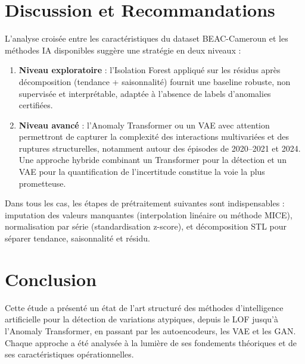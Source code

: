 \documentclass[12pt, a4paper]{article}
\begin{document}
\section{Discussion et Recommandations}
\label{sec:discussion}

L'analyse croisée entre les caractéristiques du dataset BEAC-Cameroun et
les méthodes IA disponibles suggère une stratégie en deux niveaux :

\begin{enumerate}
    \item \textbf{Niveau exploratoire} : l'Isolation Forest appliqué sur
          les résidus après décomposition (tendance + saisonnalité) fournit
          une baseline robuste, non supervisée et interprétable, adaptée à
          l'absence de labels d'anomalies certifiées.

    \item \textbf{Niveau avancé} : l'Anomaly Transformer ou un VAE avec
          attention permettront de capturer la complexité des interactions
          multivariées et des ruptures structurelles, notamment autour des
          épisodes de 2020--2021 et 2024. Une approche hybride combinant
          un Transformer pour la détection et un VAE pour la quantification
          de l'incertitude constitue la voie la plus prometteuse.
\end{enumerate}

Dans tous les cas, les étapes de prétraitement suivantes sont indispensables :
imputation des valeurs manquantes (interpolation linéaire ou méthode MICE),
normalisation par série (standardisation z-score), et décomposition STL
pour séparer tendance, saisonnalité et résidu.


\section{Conclusion}
\label{sec:conclusion}

Cette étude a présenté un état de l'art structuré des méthodes d'intelligence
artificielle pour la détection de variations atypiques, depuis le LOF
jusqu'à l'Anomaly Transformer, en passant par les autoencodeurs, les VAE
et les GAN. Chaque approche a été analysée à la lumière de ses fondements
théoriques et de ses caractéristiques opérationnelles.
\end{document}
